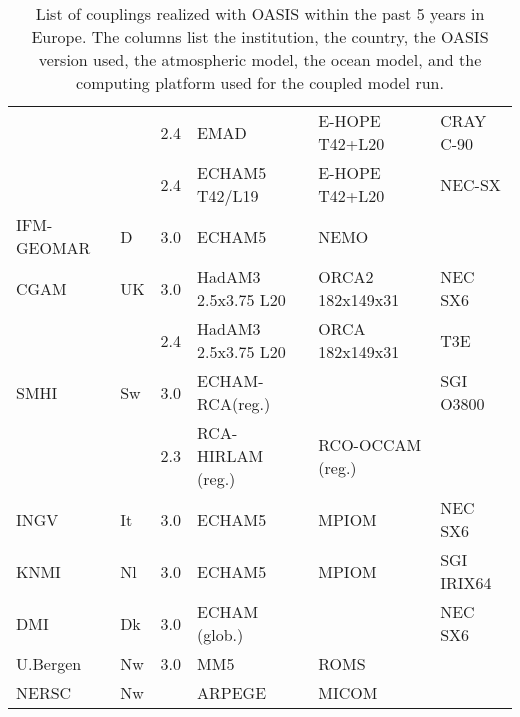 \begin{table}[hbtp]
\begin{center}
\begin{tabular}{|l|l|l|l|l|l|}
        &     &	2.4 & EMAD	         & E-HOPE T42+L20 & CRAY C-90 \\
        &     &	2.4 & ECHAM5 T42/L19     & E-HOPE T42+L20 & NEC-SX \\
\hline
IFM-GEOMAR & D & 3.0 & ECHAM5            & NEMO         &         \\
CGAM	& UK  & 3.0 & HadAM3 2.5x3.75 L20 & ORCA2 182x149x31 & NEC SX6\\
        &     &	2.4 & HadAM3 2.5x3.75 L20 & ORCA 182x149x31  & T3E   \\
\hline
SMHI	& Sw  &	3.0 & ECHAM-RCA(reg.)       &                & SGI O3800\\
        &     &	2.3 & RCA-HIRLAM (reg.)   & RCO-OCCAM (reg.)&   \\	
\hline
INGV	& It  & 3.0 & ECHAM5              & MPIOM	    & NEC SX6 \\
\hline
KNMI	& Nl  & 3.0 & ECHAM5              & MPIOM           & SGI IRIX64 \\
\hline
DMI	& Dk  & 3.0 & ECHAM (glob.)      &                 & NEC SX6 \\
\hline
U.Bergen& Nw  & 3.0 & MM5                & ROMS	           & \\
\hline
NERSC   & Nw  &  & ARPEGE                & MICOM	           & \\
\hline					
\end{tabular}
\end{center}
\caption{List of couplings realized with OASIS within the past 5 years
in Europe. The columns list the institution, the country, the OASIS
version used, the atmospheric model, the ocean model, and the
computing platform used for the coupled model run.}
\label{tab.couplingseurope}
\end{table}	



